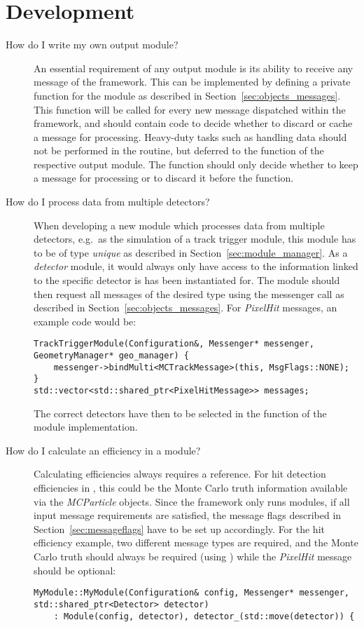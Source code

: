 \section{Development}
\begin{description}
\item[How do I write my own output module?]
An essential requirement of any output module is its ability to receive any message of the framework.
This can be implemented by defining a private  function for the module as described in Section~\ref{sec:objects_messages}.
This function will be called for every new message dispatched within the framework, and should contain code to decide whether to discard or cache a message for processing.
Heavy-duty tasks such as handling data should not be performed in the  routine, but deferred to the  function of the respective output module.
The  function should only decide whether to keep a message for processing or to discard it before the  function.

\item[How do I process data from multiple detectors?]
When developing a new \apsq module which processes data from multiple detectors, e.g.\ as the simulation of a track trigger module, this module has to be of type \emph{unique} as described in Section~\ref{sec:module_manager}.
As a \emph{detector} module, it would always only have access to the information linked to the specific detector is has been instantiated for.
The module should then request all messages of the desired type using the messenger call  as described in Section~\ref{sec:objects_messages}.
For \emph{PixelHit} messages, an example code would be:

\begin{verbatim}
TrackTriggerModule(Configuration&, Messenger* messenger, GeometryManager* geo_manager) {
    messenger->bindMulti<MCTrackMessage>(this, MsgFlags::NONE);
}
std::vector<std::shared_ptr<PixelHitMessage>> messages;
\end{verbatim}
The correct detectors have then to be selected in the  function of the module implementation.
\item[How do I calculate an efficiency in a module?]
Calculating efficiencies always requires a reference.
For hit detection efficiencies in \apsq, this could be the Monte Carlo truth information available via the \emph{MCParticle} objects.
Since the framework only runs modules, if all input message requirements are satisfied, the message flags described in Section~\ref{sec:messageflags} have to be set up accordingly.
For the hit efficiency example, two different message types are required, and the Monte Carlo truth should always be required (using ) while the \emph{PixelHit} message should be optional:
\begin{verbatim}
MyModule::MyModule(Configuration& config, Messenger* messenger, std::shared_ptr<Detector> detector)
    : Module(config, detector), detector_(std::move(detector)) {


\end{verbatim}
\end{description}
